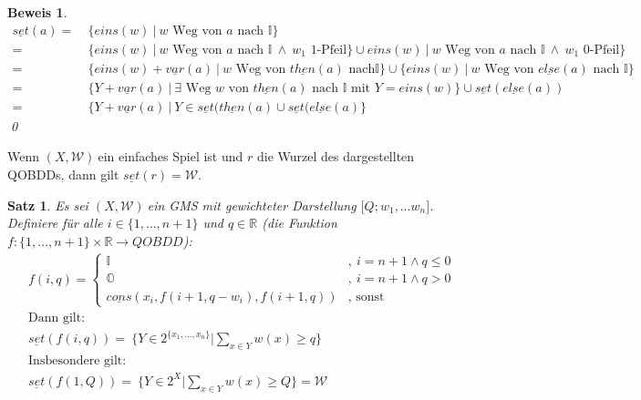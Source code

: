\documentclass[ngerman]{scrartcl}
\theoremstyle{custom}
\newtheorem{ms}[mdef]{Satz}
\newtheorem*{bw}{Beweis}
\newcommand{\0}{\mathbf{0}}
\newcommand{\1}{\mathbf{L}}
\newcommand{\then}{\underline{then}}
\newcommand{\el}{\underline{else}}
\newcommand{\var}{\underline{var}}
\newcommand{\set}{\underline{set}}
\newcommand{\cons}{\underline{cons}}
\newcommand{\sg}{$(X,\mathcal{W})~$}
\newcommand{\gms}{$\lbrack Q; w_1, \dots w_n \rbrack$}
\begin{document}
\begin{bw}
\begin{align*}
\set(a) =&~ \{ eins(w) ~\vert~ w \text{ Weg von } a \text{ nach }
\mathds{I}\}\\
=&~ \{ eins(w) ~\vert~ w \text{ Weg von } a \text{ nach } \mathds{I}
~\wedge~ w_1 \text{ 1-Pfeil}\} \cup eins(w) ~\vert~ w \text{ Weg von } a \text{ nach } \mathds{I}
~\wedge~ w_1 \text{ 0-Pfeil}\} \\
=&~ \{ eins(w)+\var(a) ~\vert~ w \text{ Weg von } \then(a) \text{ nach
} \mathds{I}\} \cup \{ eins(w) ~\vert~ w \text{ Weg von } \el(a)
  \text{ nach } \mathds{I}\} \\
=&~ \{ Y+\var(a) ~\vert~ \exists\text{ Weg } w \text{ von } \then(a) \text{ nach }
\mathds{I} \text{ mit } Y = eins(w)\} \cup \set(\el(a))\\
=&~\{Y+\var(a) ~\vert~ Y \in \set(\then(a) \cup \set(\el(a)\}
\end{align*}
\qed
\end{bw}

Wenn \sg ein einfaches Spiel ist und $r$ die Wurzel des dargestellten QOBDDs,
dann gilt $\set(r) = \mathcal{W}$.

\begin{ms}\label{sat:fiq}
Es sei \sg ein GMS mit gewichteter Darstellung \gms. Definiere f\"ur
alle $i \in \{1, \dots, n+1\}$ und $q \in \mathds{R}$ (die Funktion
$f:\{1, \dots, n+1\} \times \mathds{R} \rightarrow QOBDD$):
\begin{align*}
&f(i,q) = \begin{cases}
\mathds{I} &,~ i = n+1 \wedge q \leq 0\\
\mathds{O} &,~ i = n+1 \wedge q > 0\\
\cons(x_i, f(i+1, q-w_i), f(i+1, q)) &,\text{ sonst }
\end{cases}\\
&\text{Dann gilt:}\\
&\set(f(i,q)) = ~\biggr \{ Y \in 2^{\{x_1,\dots,x_n\}} \biggr \vert \sum_{x \in Y} w(x)
\geq q \biggr\}\\
&\text{Insbesondere gilt:}\\
&\set(f(1,Q))= ~\biggr\{Y \in 2^X \biggr \vert \sum_{x \in Y} w(x) \geq
Q \biggr \} = \mathcal{W}
\end{align*}
\end{ms}
\end{document}
